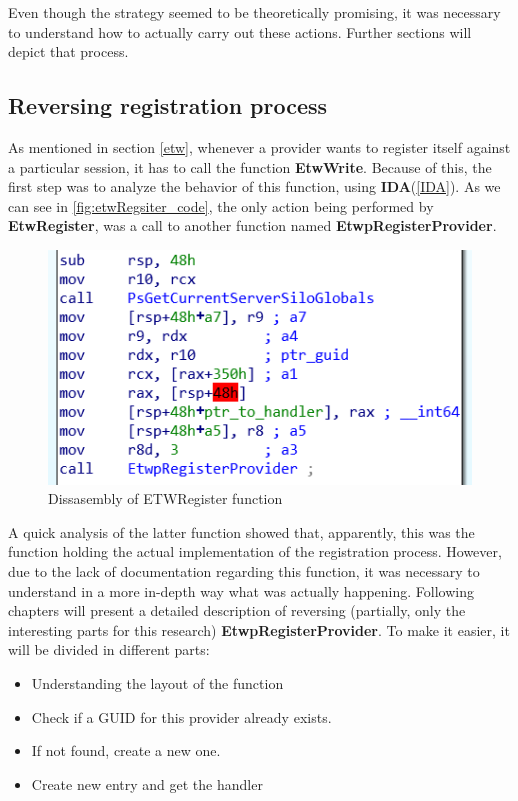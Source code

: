 Even though the strategy seemed to be theoretically promising, it was necessary to understand how to actually carry out these actions. Further sections will depict that process.













\subsection{Reversing registration process}
As mentioned in section \ref{etw}, whenever a provider wants to register itself against a particular session, it has to call the function {\bfseries EtwWrite}.
Because of this, the first step was to analyze the behavior of this function, using {\bfseries IDA}(\ref{IDA}). As we can see in \ref{fig:etwRegsiter_code}, the only action being performed by {\bfseries EtwRegister}, was a call to another function named {\bfseries EtwpRegisterProvider}. 

\begin{centering}
\begin{figure}[H]
  \includegraphics[width=12cm]{images/etwRegister_code.png}
  \caption[]{Dissasembly of ETWRegister function}
  \label{fig:etwRegister_code}
\end{figure}
\end{centering}

A quick analysis of the latter function showed that, apparently, this was the function holding the actual implementation of the registration process. However, due to the lack of documentation regarding this function, it was necessary to understand in a more in-depth way what was actually happening. Following chapters will present a detailed description of reversing (partially, only the interesting parts for this research) {\bfseries EtwpRegisterProvider}. 
To make it easier, it will be divided in different parts:
\begin{itemize}
  \item Understanding the layout of the function
  \item Check if a GUID for this provider already exists.
  \item If not found, create a new one.
  \item Create new entry and get the handler 
\end{itemize}





